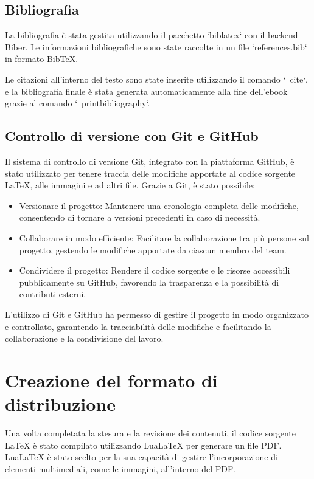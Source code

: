 \documentclass[a4paper,12pt]{report}
\begin{document}
\subsection{Bibliografia}

La bibliografia è stata gestita utilizzando il pacchetto `biblatex` con il backend Biber. Le informazioni bibliografiche sono state raccolte in un file `references.bib` in formato BibTeX.

Le citazioni all'interno del testo sono state inserite utilizzando il comando `\ cite`, e la bibliografia finale è stata generata automaticamente alla fine dell'ebook grazie al comando `\ printbibliography`.

\subsection{Controllo di versione con Git e GitHub}

Il sistema di controllo di versione Git, integrato con la piattaforma GitHub, è stato utilizzato per tenere traccia delle modifiche apportate al codice sorgente LaTeX, alle immagini e ad altri file. 
Grazie a Git, è stato possibile:

\begin{itemize}
\item Versionare il progetto: Mantenere una cronologia completa delle modifiche, consentendo di tornare a versioni precedenti in caso di necessità.
\item Collaborare in modo efficiente: Facilitare la collaborazione tra più persone sul progetto, gestendo le modifiche apportate da ciascun membro del team.
\item Condividere il progetto: Rendere il codice sorgente e le risorse accessibili pubblicamente su GitHub, favorendo la trasparenza e la possibilità di contributi esterni.
\end{itemize}

L'utilizzo di Git e GitHub ha permesso di gestire il progetto in modo organizzato e controllato, garantendo la tracciabilità delle modifiche e facilitando la collaborazione e la condivisione del lavoro.

\section{Creazione del formato di distribuzione}

Una volta completata la stesura e la revisione dei contenuti, il codice sorgente LaTeX è stato compilato utilizzando LuaLaTeX per generare un file PDF. LuaLaTeX è stato scelto per la sua capacità di gestire l'incorporazione di elementi multimediali, come le immagini, all'interno del PDF.
\end{document}
